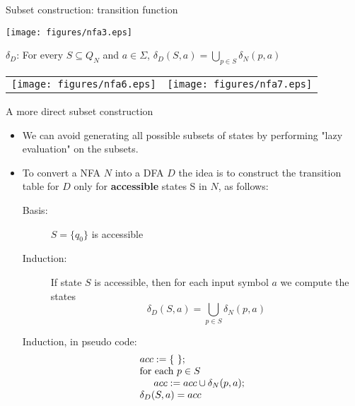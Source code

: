 \documentclass{prosper}%
\newcommand{\sg}{{\mbox{$\Sigma$}}}
\begin{document}
\begin{slide}{Subset construction: transition function}

\begin{center}
\texttt{[image: figures/nfa3.eps]}
\end{center}

$\delta_D$: For every $S\subseteq Q_N$ and $a\in \sg$, $\delta_D(S,a)=\displaystyle\bigcup_{p\in S}\delta_N(p,a)$

\begin{center}
\begin{tabular}{ll}
\texttt{[image: figures/nfa6.eps]}&
\texttt{[image: figures/nfa7.eps]}
\end{tabular}
\end{center}
\end{slide}

\begin{slide}{A more direct subset construction}
\begin{itemize} 
\item We can avoid generating all possible subsets of states by performing "lazy evaluation" on the subsets.
\item To convert a NFA $N$ into a DFA $D$ the idea is to construct the transition table for $D$  only for {\bf accessible} states S in $N$, as follows:

\begin{minipage}{6cm}
\begin{description}
\item[Basis:] $S=\{q_0\}$ is accessible
\item[Induction:]  If state $S$ is accessible, then for each input symbol $a$ we compute the  states 
\[\delta_D(S,a)= \displaystyle\bigcup_{p\in S}\delta_N(p,a)\]
\end{description}
\end{minipage}
\begin{minipage}{4cm}
{\blue
Induction, in pseudo code:
\[
\begin{array}{l}
acc := \{\ \};\\
\mbox{for each } p \in S\\
\hspace{.5cm} acc := acc \cup \delta_N(p,a);\\
\delta_D(S,a) = acc
\end{array}
\]
}
\end{minipage}
\end{itemize}

\end{slide}
\end{document}
